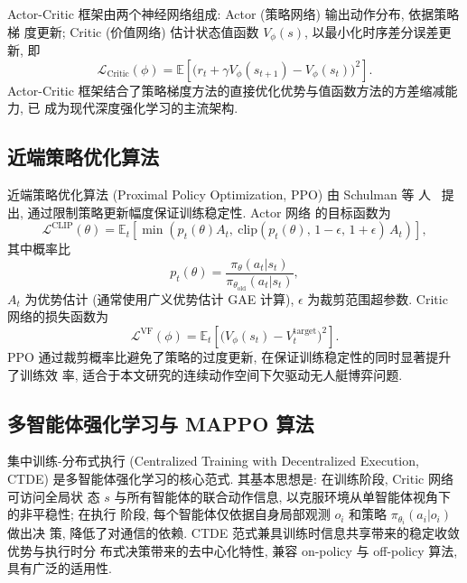 Actor-Critic 框架由两个神经网络组成: Actor (策略网络) 输出动作分布, 依据策略梯
度更新; Critic (价值网络) 估计状态值函数 $V_\phi(s)$, 以最小化时序差分误差更新,
即
\begin{equation}
\mathcal{L}_{\mathrm{Critic}}(\phi) = \mathbb{E}\left[\big(r_t + \gamma V_\phi(s_{t+1}) - V_\phi(s_t)\big)^2\right].
\end{equation}
Actor-Critic 框架结合了策略梯度方法的直接优化优势与值函数方法的方差缩减能力, 已
成为现代深度强化学习的主流架构.

\subsection{近端策略优化算法}
\label{subsec:ppo}
近端策略优化算法 (Proximal Policy Optimization, PPO) 由 Schulman 等
人~\cite{schulman2017ppo} 提出, 通过限制策略更新幅度保证训练稳定性. Actor 网络
的目标函数为
\begin{equation}
\mathcal{L}^{\mathrm{CLIP}}(\theta) = \mathbb{E}_t\!\left[\min\left(p_t(\theta) A_t,\ \mathrm{clip}(p_t(\theta),\, 1-\epsilon,\, 1+\epsilon)\, A_t\right)\right],
\label{eq:ppo_clip}
\end{equation}
其中概率比
\begin{equation}
p_t(\theta) = \frac{\pi_\theta(a_t|s_t)}{\pi_{\theta_{\mathrm{old}}}(a_t|s_t)},
\label{eq:prob_ratio}
\end{equation}
$A_t$ 为优势估计 (通常使用广义优势估计 GAE 计算), $\epsilon$ 为裁剪范围超参数.
Critic 网络的损失函数为
\begin{equation}
\mathcal{L}^{\mathrm{VF}}(\phi) = \mathbb{E}_t\!\left[\big(V_\phi(s_t) - V_t^{\mathrm{target}}\big)^2\right].
\label{eq:ppo_vf}
\end{equation}
PPO 通过裁剪概率比避免了策略的过度更新, 在保证训练稳定性的同时显著提升了训练效
率, 适合于本文研究的连续动作空间下欠驱动无人艇博弈问题.

\subsection{多智能体强化学习与 MAPPO 算法}
\label{subsec:marl_mappo}
集中训练-分布式执行 (Centralized Training with Decentralized Execution, CTDE)
是多智能体强化学习的核心范式. 其基本思想是: 在训练阶段, Critic 网络可访问全局状
态 $s$ 与所有智能体的联合动作信息, 以克服环境从单智能体视角下的非平稳性; 在执行
阶段, 每个智能体仅依据自身局部观测 $o_i$ 和策略 $\pi_{\theta_i}(a_i|o_i)$ 做出决
策, 降低了对通信的依赖. CTDE 范式兼具训练时信息共享带来的稳定收敛优势与执行时分
布式决策带来的去中心化特性, 兼容 on-policy 与 off-policy 算法, 具有广泛的适用性.

